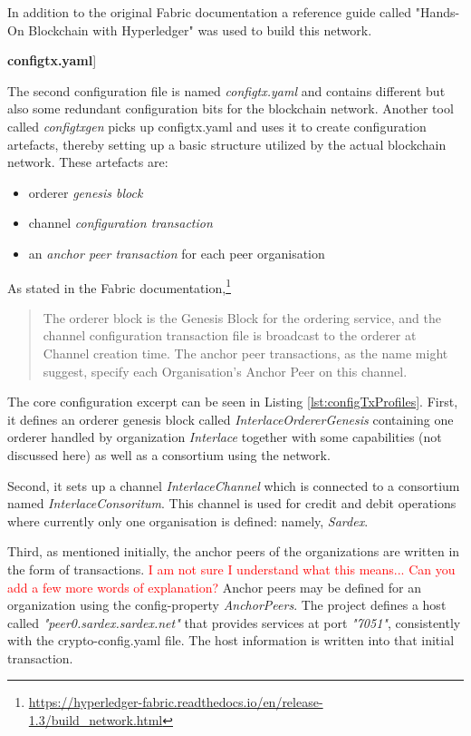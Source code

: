 In addition to the original Fabric documentation a reference guide called "Hands-On Blockchain with Hyperledger" \cite{HandsOnBlockchainHyperledger2018} was used to build this network.

\textbf{configtx.yaml}]

The second configuration file is named \textit{configtx.yaml} and contains different but also some redundant configuration bits for the blockchain network. Another tool called \textit{configtxgen} picks up configtx.yaml and uses it to create configuration artefacts, thereby setting up a basic structure utilized by the actual blockchain network. These artefacts are:

\begin{itemize}
	\item orderer \textit{genesis block}
	\item channel \textit{configuration transaction}
	\item an \textit{anchor peer transaction} for each peer organisation
\end{itemize}

As stated in the Fabric documentation,\footnote{\url{https://hyperledger-fabric.readthedocs.io/en/release-1.3/build_network.html}}
\begin{quote}
\small
The orderer block is the Genesis Block for the ordering service, and the channel configuration transaction file is broadcast to the orderer at Channel creation time. The anchor peer transactions, as the name might suggest, specify each Organisation's Anchor Peer on this channel.
\end{quote}

The core configuration excerpt can be seen in Listing \ref{lst:configTxProfiles}. First, it defines an orderer genesis block called \textit{InterlaceOrdererGenesis} containing one orderer handled by organization \textit{Interlace} together with some capabilities (not discussed here) as well as a consortium using the network.

Second, it sets up a channel \textit{InterlaceChannel} which is connected to a consortium named \textit{InterlaceConsoritum}. This channel is used for credit and debit operations where currently only one organisation is defined: namely, \textit{Sardex}.

Third, as mentioned initially, the anchor peers of the organizations are written in the form of transactions. \textcolor{red}{I am not sure I understand what this means... Can you add a few more words of explanation?} Anchor peers may be defined for an organization using the config-property \textit{AnchorPeers}. The project defines a host called \textit{"peer0.sardex.sardex.net"} that provides services at port \textit{"7051"}, consistently with the crypto-config.yaml file. The host information is written into that initial transaction.

